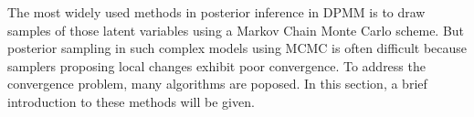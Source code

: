 	 The most widely used methods in posterior inference in DPMM is to draw samples of those latent variables using a Markov Chain Monte Carlo scheme. But posterior sampling in such complex models using MCMC is often difficult because samplers proposing local changes exhibit poor convergence. To address the convergence problem, many algorithms are poposed. In this section, a brief introduction to these methods will be given.
	 \begin{figure}[tbph!]
		 \centering
		 \hspace{1in}
\end{figure}
